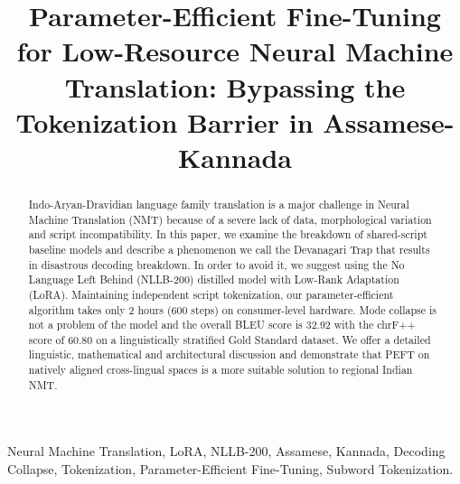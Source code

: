 \documentclass[conference]{IEEEtran}
\begin{document}
\title{Parameter-Efficient Fine-Tuning for Low-Resource Neural Machine Translation: Bypassing the Tokenization Barrier in Assamese-Kannada}

\author{
    \and
}

\maketitle

\begin{abstract}
Indo-Aryan-Dravidian language family translation is a major challenge in Neural Machine Translation (NMT) because of a severe lack of data, morphological variation and script incompatibility. In this paper, we examine the breakdown of shared-script baseline models and describe a phenomenon we call the Devanagari Trap that results in disastrous decoding breakdown. In order to avoid it, we suggest using the No Language Left Behind (NLLB-200) distilled model with Low-Rank Adaptation (LoRA). Maintaining independent script tokenization, our parameter-efficient algorithm takes only 2 hours (600 steps) on consumer-level hardware. Mode collapse is not a problem of the model and the overall BLEU score is 32.92 with the chrF++ score of 60.80 on a linguistically stratified Gold Standard dataset. We offer a detailed linguistic, mathematical and architectural discussion and demonstrate that PEFT on natively aligned cross-lingual spaces is a more suitable solution to regional Indian NMT.
\end{abstract}

\begin{IEEEkeywords}
Neural Machine Translation, LoRA, NLLB-200, Assamese, Kannada, Decoding Collapse, Tokenization, Parameter-Efficient Fine-Tuning, Subword Tokenization.
\end{IEEEkeywords}
\end{document}
